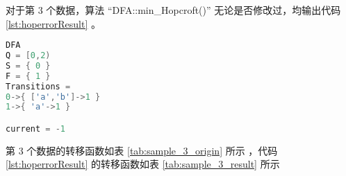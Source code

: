 对于第 3 个数据，算法 “DFA::min\_Hopcroft()” 无论是否修改过，均输出代码 \ref{lst:hoperrorResult} 。
\lstset{style=mystyle}
\begin{lstlisting}[language=C++,label={lst:hoperrorResult},caption={ 第 3 个数据在算法 “DFA::min\_Hopcroft()” 中的输出 }]
DFA
Q = [0,2)
S = { 0 }
F = { 1 }
Transitions =
0->{ ['a','b']->1 }
1->{ 'a'->1 }

current = -1
\end{lstlisting}

第 3 个数据的转移函数如表 \ref{tab:sample_3_origin} 所示 ，代码 \ref{lst:hoperrorResult} 的转移函数如表 \ref{tab:sample_3_result} 所示 


